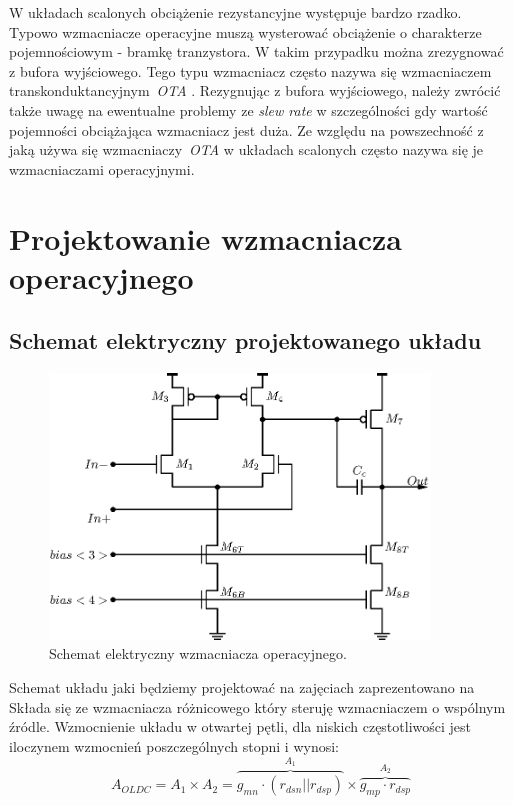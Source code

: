 \documentclass[twoside,pl,final]{labman}
\begin{document}
W układach scalonych obciążenie rezystancyjne występuje bardzo rzadko.
Typowo wzmacniacze operacyjne muszą wysterować obciążenie
o charakterze pojemnościowym - bramkę tranzystora.
W takim przypadku można zrezygnować z bufora wyjściowego.
Tego typu wzmacniacz często nazywa się wzmacniaczem
transkonduktancyjnym~\emph{OTA} .
Rezygnując z bufora wyjściowego, należy zwrócić także uwagę na
ewentualne problemy ze \emph{slew rate} w szczególności gdy wartość
pojemności obciążająca wzmacniacz jest duża.
Ze względu na powszechność z jaką używa się wzmacniaczy~\emph{OTA}
w układach scalonych często nazywa się je wzmacniaczami operacyjnymi.

\chapter{Projektowanie wzmacniacza operacyjnego}
\label{opamp}

\section{Schemat elektryczny projektowanego układu}
\label{opamp:schematic}
\begin{figure}[!htbp]
  \centering
  \includegraphics[width=0.9\textwidth]{schematic}
  \caption{Schemat elektryczny wzmacniacza operacyjnego.}
  \label{fig:schematic}
\end{figure}

Schemat układu jaki będziemy projektować
na zajęciach zaprezentowano na~
Składa się ze wzmacniacza różnicowego który steruję
wzmacniaczem o wspólnym źródle.
Wzmocnienie układu w otwartej pętli, dla niskich częstotliwości
jest iloczynem wzmocnień poszczególnych stopni i wynosi:
\begin{equation}
  A_{OLDC} = A_1 \times A_2 =
    \overbrace{g_{mn} \cdot (r_{dsn} || r_{dsp})}^{A_1} \times
    \overbrace{g_{mp} \cdot r_{dsp}}^{A_2}
\end{equation}
\end{document}
